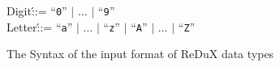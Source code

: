 \begin{figure}[htbp]
\begin{center}
\begin{minipage}{5.9in}
\begin{tabbing}
\>Digit\'::=\>
         ``{\tt 0}'' $|$ $\ldots$ $|$ ``{\tt 9}'' \\
\>Letter\'::=\>
         ``{\tt a}'' $|$ $\ldots$ $|$ ``{\tt z}'' $|$  
         ``{\tt A}'' $|$ $\ldots$ $|$ ``{\tt Z}'' \\
\end{tabbing}
\end{minipage} 
\end{center}
\caption{The Syntax of the input format of ReDuX data types} \label{fi:syn}
\end{figure}
